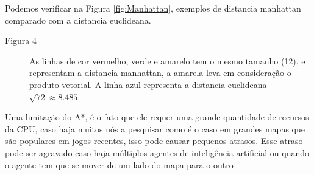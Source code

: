 Podemos verificar na Figura \ref{fig:Manhattan}, exemplos de distancia manhattan comparado com a distancia euclideana.

\begin{minipage}{\linewidth}
    \label{fig:Manhattan}
\end{minipage}

\begin{description}
    \item[Figura 4] As linhas de cor vermelho, verde e amarelo tem o mesmo tamanho (12), e representam a distancia manhattan, a amarela leva em consideração o produto vetorial.
    A linha azul representa a distancia euclideana $\sqrt{72} \approx 8.485$
\end{description}

Uma limitação do A*, é o fato que ele requer uma grande quantidade de recursos da CPU, caso haja muitos nós a pesquisar como é o caso em grandes mapas que são populares em jogos recentes, isso  pode causar pequenos atrasos.
Esse atraso pode ser agravado caso haja múltiplos agentes de inteligência artificial ou quando o agente tem que se mover de um lado do mapa para o outro 

